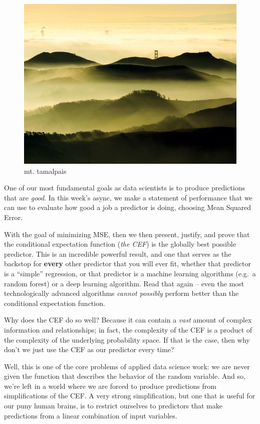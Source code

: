 \documentclass[
]{book}
\theoremstyle{definition}
\theoremstyle{definition}
\theoremstyle{definition}
\theoremstyle{definition}
\theoremstyle{remark}
\begin{document}
\begin{figure}
\centering
\includegraphics{./images/tam-view.jpeg}
\caption{mt. tamalpais}
\end{figure}

One of our most fundamental goals as data scientists is to produce predictions that are \emph{good}. In this week's async, we make a statement of performance that we can use to evaluate how good a job a predictor is doing, choosing Mean Squared Error.

With the goal of minimizing MSE, then we then present, justify, and prove that the conditional expectation function (\emph{the CEF}) is the globally best possible predictor. This is an incredible powerful result, and one that serves as the backstop for \textbf{every} other predictor that you will ever fit, whether that predictor is a ``simple'' regression, or that predictor is a machine learning algorithms (e.g.~a random forest) or a deep learning algorithm. Read that again -- even the most technologically advanced algorithms \emph{cannot possibly} perform better than the conditional expectation function.

Why does the CEF do so well? Because it can contain a \emph{vast} amount of complex information and relationships; in fact, the complexity of the CEF is a product of the complexity of the underlying probability space. If that is the case, then why don't we just use the CEF as our predictor every time?

Well, this is one of the core problems of applied data science work: we are never given the function that describes the behavior of the random variable. And so, we're left in a world where we are forced to produce predictions from simplifications of the CEF. A very strong simplification, but one that is useful for our puny human brains, is to restrict ourselves to predictors that make predictions from a linear combination of input variables.
\end{document}
